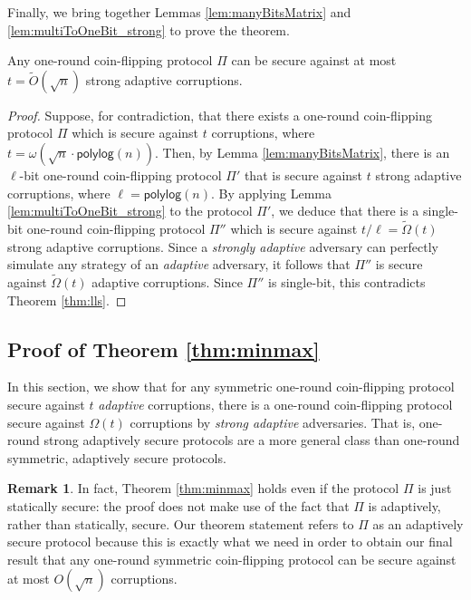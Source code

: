 \documentclass[11pt,letterpaper]{article}
\theoremstyle{plain}
\theoremstyle{definition}
\newtheorem*{remark}{Remark}
\newenvironment{customthm}[1]
  {\renewcommand\theinnercustomthm{#1}\innercustomthm}
  {\endinnercustomthm}
\newcommand{\polylog}{\mathsf{polylog}}
\begin{document}
Finally, we bring together Lemmas \ref{lem:manyBitsMatrix} and \ref{lem:multiToOneBit_strong} to prove the theorem.

\begin{customthm}{\ref{thm:main}}
Any one-round coin-flipping protocol $\Pi$ can be secure against at most $t=\widetilde{O}(\sqrt n)$ strong adaptive corruptions.
\end{customthm}
\begin{proof}
Suppose, for contradiction, that there exists a one-round coin-flipping protocol $\Pi$ which is secure against $t$ corruptions,
where $t=\omega(\sqrt{n}\cdot\polylog(n))$.
Then, by Lemma \ref{lem:manyBitsMatrix}, there is an $\ell$-bit one-round coin-flipping protocol $\Pi'$
that is secure against $t$ strong adaptive corruptions, where $\ell=\polylog(n)$. 
By applying Lemma \ref{lem:multiToOneBit_strong} to the protocol $\Pi'$,
we deduce that there is a single-bit one-round coin-flipping protocol $\Pi''$ which is secure against $t/\ell=\widetilde{\Omega}(t)$ strong adaptive corruptions.
Since a \emph{strongly adaptive} adversary can perfectly simulate
any strategy of an \emph{adaptive} adversary, it follows that $\Pi''$ is secure against $\widetilde{\Omega}(t)$ adaptive corruptions.
Since $\Pi''$ is single-bit, this contradicts Theorem \ref{thm:lls}.
\end{proof}


\subsection{Proof of Theorem \ref{thm:minmax}}

In this section, we show that for any symmetric one-round coin-flipping protocol secure against $t$ \emph{adaptive} corruptions,
there is a one-round coin-flipping protocol secure against $\Omega(t)$ corruptions by \emph{strong adaptive} adversaries.
That is, one-round strong adaptively secure protocols are a more general class than one-round symmetric, adaptively secure protocols.

\begin{remark}
In fact, Theorem \ref{thm:minmax} holds even if the protocol $\Pi$ is just statically secure: the proof does not make use of the fact
that $\Pi$ is adaptively, rather than statically, secure. 
Our theorem statement refers to $\Pi$ as an adaptively secure protocol because this is exactly what we need in order to obtain our final result
that any one-round symmetric coin-flipping protocol can be secure against at most $O(\sqrt{n})$ corruptions.
\end{remark}
\end{document}
